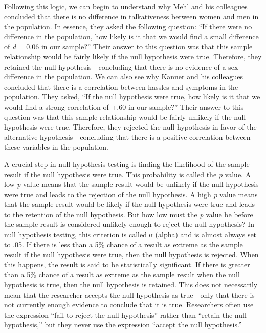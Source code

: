\documentclass[
]{krantz}
\begin{document}
Following this logic, we can begin to understand why Mehl and his colleagues concluded that there is no difference in talkativeness between women and men in the population. In essence, they asked the following question: ``If there were no difference in the population, how likely is it that we would find a small difference of \emph{d} = 0.06 in our sample?'' Their answer to this question was that this sample relationship would be fairly likely if the null hypothesis were true. Therefore, they retained the null hypothesis---concluding that there is no evidence of a sex difference in the population. We can also see why Kanner and his colleagues concluded that there is a correlation between hassles and symptoms in the population. They asked, ``If the null hypothesis were true, how likely is it that we would find a strong correlation of +.60 in our sample?'' Their answer to this question was that this sample relationship would be fairly unlikely if the null hypothesis were true. Therefore, they rejected the null hypothesis in favor of the alternative hypothesis---concluding that there is a positive correlation between these variables in the population.

A crucial step in null hypothesis testing is finding the likelihood of the sample result if the null hypothesis were true. This probability is called the \hyperref[p-value]{\emph{p} value}. A low \emph{p} value means that the sample result would be unlikely if the null hypothesis were true and leads to the rejection of the null hypothesis. A high \emph{p} value means that the sample result would be likely if the null hypothesis were true and leads to the retention of the null hypothesis. But how low must the \emph{p} value be before the sample result is considered unlikely enough to reject the null hypothesis? In null hypothesis testing, this criterion is called \hyperref[ux3b1-alpha]{α (alpha)} and is almost always set to .05. If there is less than a 5\% chance of a result as extreme as the sample result if the null hypothesis were true, then the null hypothesis is rejected. When this happens, the result is said to be \hyperref[statistically-significant]{statistically significant}. If there is greater than a 5\% chance of a result as extreme as the sample result when the null hypothesis is true, then the null hypothesis is retained. This does not necessarily mean that the researcher accepts the null hypothesis as true---only that there is not currently enough evidence to conclude that it is true. Researchers often use the expression ``fail to reject the null hypothesis'' rather than ``retain the null hypothesis,'' but they never use the expression ``accept the null hypothesis.''
\end{document}
